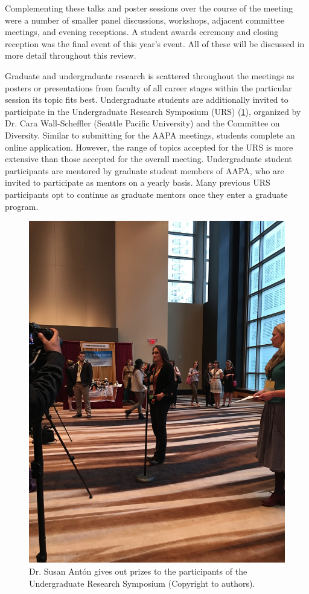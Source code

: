 \documentclass[english]{ijsra}
\begin{document}
Complementing these talks and poster sessions over the course of the meeting were a number of smaller panel discussions,
workshops, adjacent committee meetings, and evening receptions. 
A student awards ceremony and closing reception was the final event of this year’s event.  
All of these will be discussed in more detail throughout this review.

Graduate  and undergraduate research is scattered throughout the meetings as posters or presentations
from faculty of all career stages within the particular session its topic fits best. Undergraduate students are additionally invited
to participate in the Undergraduate Research Symposium (URS) (\cref{fig:Ward-Figure8}), organized by Dr. Cara Wall-Scheffler
(Seattle Pacific University) and the Committee on Diversity.  
Similar to submitting for the AAPA meetings, students complete an online application.
However, the range of topics accepted for the URS is more extensive than those accepted for the overall meeting.
Undergraduate student participants are mentored by graduate student members of AAPA,
who are invited to participate as mentors on a yearly basis.
Many previous URS participants opt to continue as graduate mentors once they enter a graduate program.

	\begin{figure} %
		\includegraphics[width=\linewidth]{figures/Ward-Figure8}
		\caption{Dr. Susan Antón gives out prizes to the participants of the Undergraduate Research Symposium (Copyright to authors).}
		\centering
		\label{fig:Ward-Figure8}
	\end{figure}
\end{document}
